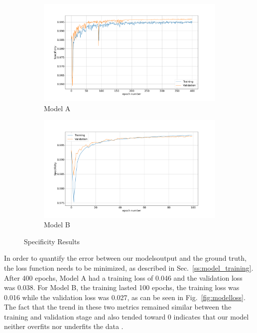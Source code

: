 \documentclass[12pt,a4paper]{scrartcl}
\begin{document}
\begin{figure}[H]
\centering
\begin{subfigure}{1\textwidth}
  \centering
  \includegraphics[width=\linewidth]{./results/model_a_specificity.png}
  \caption{Model A}
  \label{fig:model_a_specificity}
\end{subfigure}
\begin{subfigure}{1\textwidth}
  \centering
  \includegraphics[width=\linewidth]{./results/model_b_specificity.png}
  \caption{Model B}
  \label{fig:modelb_specificity}
\end{subfigure}
\caption{Specificity Results}
\label{fig:specificity_results}
\end{figure}

In order to quantify the error between our models\textquotesingle output and the ground truth, the loss function needs to be minimized, as described in Sec.~\ref{ss:model_training}. After 400 epochs, Model A had a training loss of 0.046 and the validation loss was 0.038. For Model B, the training lasted 100 epochs, the training loss was 0.016 while the validation loss was 0.027, as can be seen in Fig.~\ref{fig:modelloss}. The fact that the trend in these two metrics remained similar between the training and validation stage and also tended toward 0 indicates that our model neither overfits nor underfits the data \cite{DIDLBook}. 
\end{document}
